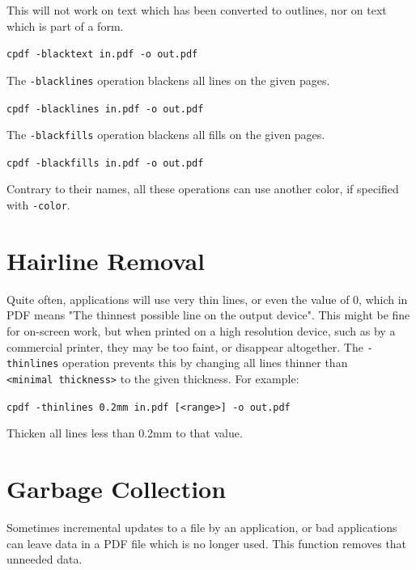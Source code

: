 \documentclass{book}
\begin{document}
  This will not work on text which has been converted to outlines, nor on text
which is part of a form.
  \begin{framed}
    \noindent\small\verb!cpdf -blacktext in.pdf -o out.pdf!
  \end{framed}


\noindent The \texttt{-blacklines} operation blackens all lines on the given pages.

  \begin{framed}
    \noindent\small\verb!cpdf -blacklines in.pdf -o out.pdf!
  \end{framed}


\noindent The \texttt{-blackfills} operation blackens all fills on the given pages.

  \begin{framed}
    \noindent\small\verb!cpdf -blackfills in.pdf -o out.pdf!
  \end{framed}

\noindent Contrary to their names, all these operations can use another color, if specified with \texttt{-color}.

  \section{Hairline Removal}
  Quite often, applications will use very thin lines, or even the value of 0,
which in PDF means "The thinnest possible line on the output device". This
might be fine for on-screen work, but when printed on a high resolution device,
such as by a commercial printer, they may be too faint, or disappear
altogether. The \texttt{-thinlines} operation prevents this by changing all lines
thinner than \texttt{<minimal~thickness>} to the given thickness. For example:
  \begin{framed}
  \small\noindent\verb!cpdf -thinlines 0.2mm in.pdf [<range>] -o out.pdf!

  \vspace{2.5mm}
  \noindent Thicken all lines less than 0.2mm to that value.
  \end{framed} 

  \section{Garbage Collection}
  Sometimes incremental updates to a file by an application, or bad
applications can leave data in a PDF file which is no longer used. This
function removes that unneeded data.
\end{document}
